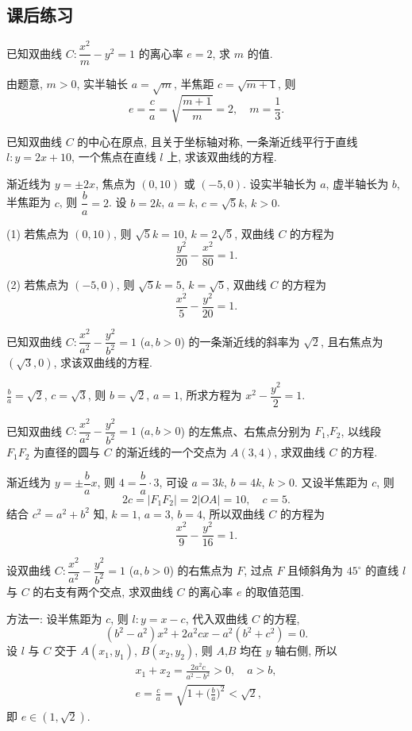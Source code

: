 \subsection{课后练习}
\begin{exercise}
    已知双曲线 $C\colon \dfrac{x^2}m -y^2=1$ 的离心率 $e=2$, 求 $m$ 的值.
\end{exercise}
\beginsolution
    由题意, $m>0$, 实半轴长 $a=\sqrt{m}$, 半焦距 $c=\sqrt{m+1}$, 则
    \[e= \frac{c}{a}= \sqrt{\frac{m+1}{m}}=2,\quad
    m= \frac13.\]
\endsolution

\begin{exercise}
    已知双曲线 $C$ 的中心在原点, 且关于坐标轴对称, 一条渐近线平行于直线 $l\colon y=2x+10$, 一个焦点在直线 $l$ 上, 求该双曲线的方程.
\end{exercise}
\beginsolution
    渐近线为 $y= \pm2x$, 焦点为 $(0,10)$ 或 $(-5,0)$. 设实半轴长为 $a$, 虚半轴长为 $b$, 半焦距为 $c$, 则 $\dfrac{b}a= 2$. 设 $b=2k$, $a=k$, $c=\sqrt5k$, $k>0$.

    (1) 若焦点为 $(0,10)$, 则 $\sqrt5k= 10$, $k=2\sqrt5$, 双曲线 $C$ 的方程为
    \[\dfrac{y^2}{20}- \dfrac{x^2}{80}= 1.\]
    
    (2) 若焦点为 $(-5,0)$, 则 $\sqrt5k= 5$, $k= \sqrt5$, 双曲线 $C$ 的方程为
    \[\dfrac{x^2}{5}- \dfrac{y^2}{20}= 1.\]
\endsolution

\begin{exercise}
    已知双曲线 $C\colon \dfrac{x^2}{a^2}- \dfrac{y^2}{b^2}=1$ ($a,b>0$) 的一条渐近线的斜率为 $\sqrt2$, 且右焦点为 $(\sqrt3, 0)$, 求该双曲线的方程.
\end{exercise}
\beginsolution
    $\frac{b}a= \sqrt2$, $c=\sqrt3$, 则 $b=\sqrt2$, $a=1$, 所求方程为 $x^2- \dfrac{y^2}2= 1$.
\endsolution

\begin{exercise}
    已知双曲线 $C\colon \dfrac{x^2}{a^2}- \dfrac{y^2}{b^2}=1$ ($a,b>0$) 的左焦点、右焦点分别为 $F_1$,$F_2$, 以线段 $F_1 F_2$ 为直径的圆与 $C$ 的渐近线的一个交点为 $A(3, 4)$, 求双曲线 $C$ 的方程.
\end{exercise}
\beginsolution
    渐近线为 $y= \pm\dfrac{b}a x$, 则 $4= \dfrac{b}a\cdot 3$, 可设 $a=3k$, $b=4k$, $k>0$. 又设半焦距为 $c$, 则
    \[2c= |F_1F_2|= 2|OA|= 10,\quad c=5.\]
    结合 $c^2= a^2+b^2$ 知, $k=1$, $a=3$, $b=4$, 所以双曲线 $C$ 的方程为
    \[\dfrac{x^2}9- \dfrac{y^2}{16}=1.\]
\endsolution

\begin{exercise}
    设双曲线 $C\colon \dfrac{x^2}{a^2}- \dfrac{y^2}{b^2}=1$ ($a,b>0$) 的右焦点为 $F$, 过点 $F$ 且倾斜角为 $45^\circ$ 的直线 $l$ 与 $C$ 的右支有两个交点, 求双曲线 $C$ 的离心率 $e$ 的取值范围.
\end{exercise}
\beginsolution
    方法一: 设半焦距为 $c$, 则 $l\colon y= x-c$, 代入双曲线 $C$ 的方程,
    \[(b^2- a^2)x^2+ 2a^2cx- a^2(b^2+c^2)= 0.\]
    设 $l$ 与 $C$ 交于 $A(x_1,y_1)$, $B(x_2,y_2)$, 则 $A$,$B$ 均在 $y$ 轴右侧, 所以
    \[\begin{gathered}
        x_1+x_2= \frac{2a^2c}{a^2-b^2}>0,\quad a>b,\\
        e= \frac{c}a= \sqrt{1+\biggl(\frac{b}a\biggr)^2}< \sqrt2,
    \end{gathered}\]
    即 $e\in (1,\sqrt2)$.

